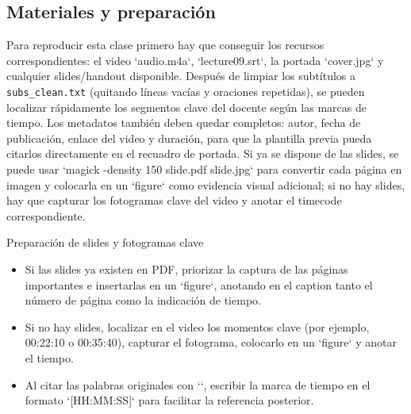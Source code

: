 \documentclass[a4paper]{article}
\begin{document}
\subsection{Materiales y preparación}
Para reproducir esta clase primero hay que conseguir los recursos correspondientes: el video `audio.m4a`, `lecture09.srt`, la portada `cover.jpg` y cualquier slides/handout disponible. Después de limpiar los subtítulos a \texttt{subs\_clean.txt} (quitando líneas vacías y oraciones repetidas), se pueden localizar rápidamente los segmentos clave del docente según las marcas de tiempo. Los metadatos también deben quedar completos: autor, fecha de publicación, enlace del video y duración, para que la plantilla previa pueda citarlos directamente en el recuadro de portada. Si ya se dispone de las slides, se puede usar `magick -density 150 slide.pdf slide.jpg` para convertir cada página en imagen y colocarla en un `figure` como evidencia visual adicional; si no hay slides, hay que capturar los fotogramas clave del video y anotar el timecode correspondiente.

\begin{knowledgebox}{Preparación de slides y fotogramas clave}
\begin{itemize}
    \item Si las slides ya existen en PDF, priorizar la captura de las páginas importantes e insertarlas en un `figure`, anotando en el caption tanto el número de página como la indicación de tiempo.
    \item Si no hay slides, localizar en el video los momentos clave (por ejemplo, 00:22:10 o 00:35:40), capturar el fotograma, colocarlo en un `figure` y anotar el tiempo.
    \item Al citar las palabras originales con `\textit{}`, escribir la marca de tiempo en el formato `[HH:MM:SS]` para facilitar la referencia posterior.
\end{itemize}
\end{knowledgebox}
\end{document}
